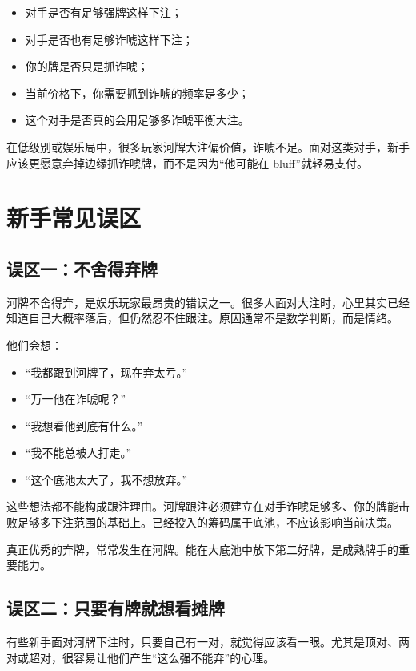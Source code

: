 \begin{itemize}
\item 对手是否有足够强牌这样下注；
\item 对手是否也有足够诈唬这样下注；
\item 你的牌是否只是抓诈唬；
\item 当前价格下，你需要抓到诈唬的频率是多少；
\item 这个对手是否真的会用足够多诈唬平衡大注。
\end{itemize}

在低级别或娱乐局中，很多玩家河牌大注偏价值，诈唬不足。面对这类对手，新手应该更愿意弃掉边缘抓诈唬牌，而不是因为“他可能在 bluff”就轻易支付。

\section{新手常见误区}

\subsection{误区一：不舍得弃牌}

河牌不舍得弃，是娱乐玩家最昂贵的错误之一。很多人面对大注时，心里其实已经知道自己大概率落后，但仍然忍不住跟注。原因通常不是数学判断，而是情绪。

他们会想：

\begin{itemize}
\item “我都跟到河牌了，现在弃太亏。”
\item “万一他在诈唬呢？”
\item “我想看他到底有什么。”
\item “我不能总被人打走。”
\item “这个底池太大了，我不想放弃。”
\end{itemize}

这些想法都不能构成跟注理由。河牌跟注必须建立在对手诈唬足够多、你的牌能击败足够多下注范围的基础上。已经投入的筹码属于底池，不应该影响当前决策。

真正优秀的弃牌，常常发生在河牌。能在大底池中放下第二好牌，是成熟牌手的重要能力。

\subsection{误区二：只要有牌就想看摊牌}

有些新手面对河牌下注时，只要自己有一对，就觉得应该看一眼。尤其是顶对、两对或超对，很容易让他们产生“这么强不能弃”的心理。

